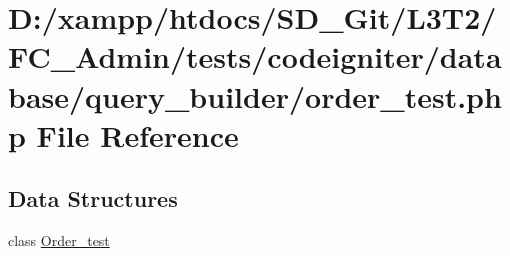 \hypertarget{_admin_2tests_2codeigniter_2database_2query__builder_2order__test_8php}{}\section{D\+:/xampp/htdocs/\+S\+D\+\_\+\+Git/\+L3\+T2/\+F\+C\+\_\+\+Admin/tests/codeigniter/database/query\+\_\+builder/order\+\_\+test.php File Reference}
\label{_admin_2tests_2codeigniter_2database_2query__builder_2order__test_8php}
\subsection*{Data Structures}
\begin{DoxyCompactItemize}
\item 
class \hyperlink{class_order__test}{Order\+\_\+test}
\end{DoxyCompactItemize}

